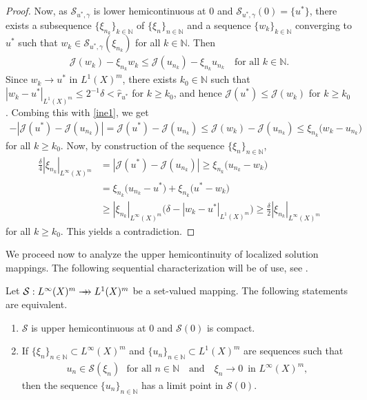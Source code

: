 \documentclass[hidelinks,onefignum,onetabnum]{siamart220329}
\newcommand{\rrightarrow}{\mathrel{\mathrlap{\rightarrow}\mkern1mu\rightarrow}}
\let\twoheadrightarrow\rrightarrow
\begin{document}
\begin{proof}
		Now, as $\mathcal S_{u^*,\gamma}$ is lower hemicontinuous at $0$ and $\mathcal S_{u^*,\gamma}(0)=\{u^*\}$, there exists a subsequence $\{\xi_{n_k}\}_{k\in\mathbb N}$ of $\{\xi_{n}\}_{n\in\mathbb N}$ and a  sequence $\{w_{k}\}_{k\in\mathbb N}$ converging to $u^*$ such that  $w_k\in\mathcal S_{u^*,\gamma}(\xi_{n_k})$ for all $k\in\mathbb N$. Then
	\begin{align}\label{ine1}
		\mathcal J(w_{k})-\xi_{n_k} w_k\le \mathcal J(u_{n_k})-\xi_{n_k} u_{n_k}\quad \text{for all $k\in\mathbb N$.}
	\end{align}
	Since $w_k\to u^*$ in $L^1(X)^m$, there exists $k_0\in\mathbb N$ such that $|w_k-u^*|_{L^1(X)^m}\le 2^{-1}\delta<\hat r_{u^*}$ for $k\ge k_0$, and hence $\mathcal J(u^*)\le \mathcal J(w_k)$ for $k\ge k_0$. Combing this with \cref{ine1}, we get
	\begin{align*}
		-|\mathcal J(u^*)-\mathcal J(u_{n_k})|=\mathcal J(u^*)-\mathcal J(u_{n_k})\le\mathcal J(w_{k})-\mathcal J(u_{n_k})\le \xi_{n_k}\big(w_k-u_{n_k}\big)
	\end{align*}
for all $k\ge k_0$.  Now, by construction of the sequence $\{\xi_n\}_{n\in\mathbb N}$, 
\begin{align*}
	\frac{\delta}{4}|\xi_{n_k}|_{L^\infty(X)^m}
	&=|\mathcal J(u^*)-\mathcal J(u_{n_k})|
	\ge
	\xi_{n_k}\big(u_{n_k}-w_{k}\big)\\
	&=\xi_{n_k}\big(u_{n_k}-u^*\big)+\xi_{n_k}\big(u^*-w_k\big)
	\\
	&\ge |\xi_{n_k}|_{L^\infty(X)^m}\big(\delta-|w_k-u^*|_{L^1(X)^m}\big)\ge \frac{\delta}{2}|\xi_{n_k}|_{L^\infty(X)^m}
\end{align*}
	for all $k\ge k_0$. This yields a contradiction.
\end{proof}




We proceed now to analyze the  upper hemicontinuity of localized solution mappings. The following sequential characterization will be of use, see \cite[Theorem 17.20]{Infdim}.

\begin{proposition}\label{uhc}
	Let $\mathcal S:L^\infty(X)^m\twoheadrightarrow L^1(X)^m$ be a set-valued mapping. The following statements are equivalent.
	\begin{enumerate}
		\item $\mathcal S$ is upper hemicontinuous at $0$ and $\mathcal S(0)$ is compact.
		
		\item If $\{\xi_{n}\}_{n\in\mathbb N}\subset L^\infty(X)^m$ and $\{u_n\}_{n\in\mathbb N}\subset L^1(X)^m$ are sequences such that
		\begin{align*}
			u_n\in \mathcal S(\xi_{n})\,\,\,\,\text{for all $n\in\mathbb N$}\quad\text{and}\quad	\xi_n\to 0\,\,\,\text{in $L^\infty(X)^m$},
		\end{align*}
		then the sequence  $\{u_n\}_{n\in\mathbb N}$ has a limit point in $\mathcal S(0)$.
	\end{enumerate}
\end{proposition}
\end{document}
